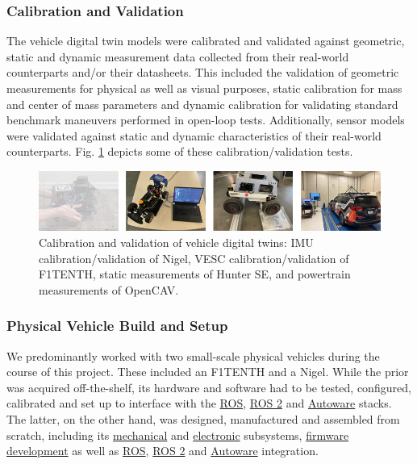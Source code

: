 \subsubsection{Calibration and Validation}
\label{Sub-Section: Calibration and Validation}

The vehicle digital twin models were calibrated and validated against geometric, static and dynamic measurement data collected from their real-world counterparts and/or their datasheets. This included the validation of geometric measurements for physical as well as visual purposes, static calibration for mass and center of mass parameters and dynamic calibration for validating standard benchmark maneuvers performed in open-loop tests. Additionally, sensor models were validated against static and dynamic characteristics of their real-world counterparts. Fig. \ref{fig: figure6} depicts some of these calibration/validation tests.

\begin{figure}[t]
    \centering
    \includegraphics[width=\linewidth]{Figures/fig6.png}
    \caption{Calibration and validation of vehicle digital twins: IMU calibration/validation of Nigel, VESC calibration/validation of F1TENTH, static measurements of Hunter SE, and powertrain measurements of OpenCAV.}
    \label{fig: figure6}
\end{figure}

\subsubsection{Physical Vehicle Build and Setup}
\label{Sub-Section: Physical Vehicle Build and Setup}

We predominantly worked with two small-scale physical vehicles during the course of this project. These included an F1TENTH and a Nigel. While the prior was acquired off-the-shelf, its hardware and software had to be tested, configured, calibrated and set up to interface with the \href{https://github.com/Tinker-Twins/AutoDRIVE-F1TENTH}{ROS}, \href{https://github.com/Tinker-Twins/AutoDRIVE-F1TENTH}{ROS 2} and \href{https://github.com/Tinker-Twins/AutoDRIVE-Autoware}{Autoware} stacks. The latter, on the other hand, was designed, manufactured and assembled from scratch, including its \href{https://github.com/AutoDRIVE-Ecosystem/Nigel-SolidWorks}{mechanical} and \href{https://github.com/AutoDRIVE-Ecosystem/Nigel-Fritzing}{electronic} subsystems, \href{https://github.com/AutoDRIVE-Ecosystem/Nigel-Arduino}{firmware development} as well as \href{https://github.com/Tinker-Twins/AutoDRIVE/tree/AutoDRIVE-Devkit/ADSS Toolkit/autodrive_ros/autodrive_nigel}{ROS}, \href{https://github.com/Tinker-Twins/AutoDRIVE/tree/AutoDRIVE-Devkit/ADSS Toolkit/autodrive_ros2/autodrive_nigel}{ROS 2} and \href{https://github.com/Tinker-Twins/AutoDRIVE-Autoware}{Autoware} integration.

